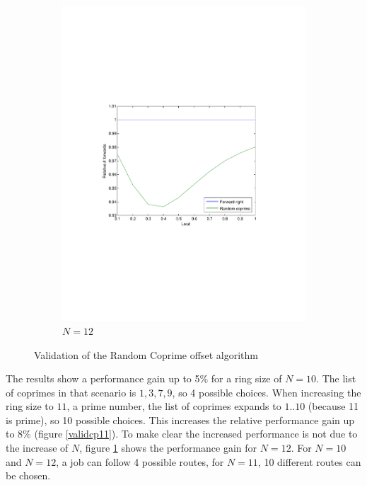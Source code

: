 \documentclass[10pt,a4paper]{article}
\begin{document}
\begin{figure}
\begin{subfigure}[b]{0.49\textwidth}
			\includegraphics[clip=true, trim=9em 24em 9em 24em, width=\textwidth]{resources/plotrandcoprime12.pdf}
			\caption{$N=12$}
			\label{validcp12}
		\end{subfigure}
\caption{Validation of the Random Coprime offset algorithm}
\label{validcp}
\end{figure}

The results show a performance gain up to 5\% for a ring size of $N=10$. The list of coprimes in that scenario is ${1, 3, 7, 9}$, so 4 possible choices. When increasing the ring size to $11$, a prime number, the list of coprimes expands to ${1..10}$ (because 11 is prime), so 10 possible choices. This increases the relative performance gain up to 8\% (figure \ref{validcp11}). To make clear the increased performance is not due to the increase of $N$, figure \ref{validcp12} shows the performance gain for $N=12$. For $N=10$ and $N=12$, a job can follow 4 possible routes, for $N=11$, 10 different routes can be chosen.
\end{document}
